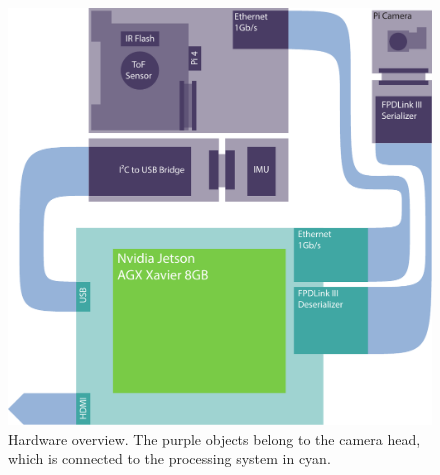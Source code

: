 \begin{figure}[H]
    \centering
    \includegraphics[width=1.0\textwidth]{images/hardware.pdf}
    \caption{Hardware overview. The purple objects belong to the camera head, which is connected to the processing system in cyan.}
    \label{fig:HW_diagram}
\end{figure}
